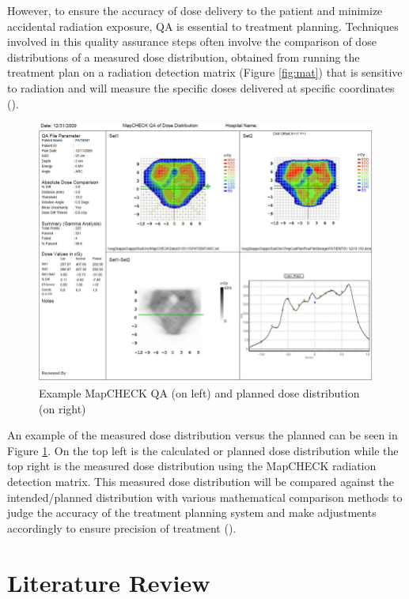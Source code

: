 \documentclass[12pt]{article}
\begin{document}
However, to ensure the accuracy of dose delivery to the patient and minimize accidental radiation exposure, QA is essential to treatment planning. Techniques involved in this quality assurance steps often involve the comparison of dose distributions of a measured dose distribution, obtained from running the treatment plan on a radiation detection matrix (Figure \ref{fig:mat}) that is sensitive to radiation and will measure the specific doses delivered at specific coordinates (\textcite{sunnuclear}).


\begin{figure}[h]
  \centering
  \includegraphics[width=\linewidth]{images/examplemap.png}
  \caption{Example MapCHECK QA (on left) and planned dose distribution (on right)}
  \label{fig:ex}
\end{figure}

An example of the measured dose distribution versus the planned can be seen in Figure \ref{fig:ex}. On the top left is the calculated or planned dose distribution while the top right is the measured dose distribution using the MapCHECK radiation detection matrix. This measured dose distribution will be compared against the intended/planned distribution with various mathematical comparison methods to judge the accuracy of the treatment planning system and make adjustments accordingly to ensure precision of treatment (\textcite{Low}).

\section{Literature Review}
\end{document}
